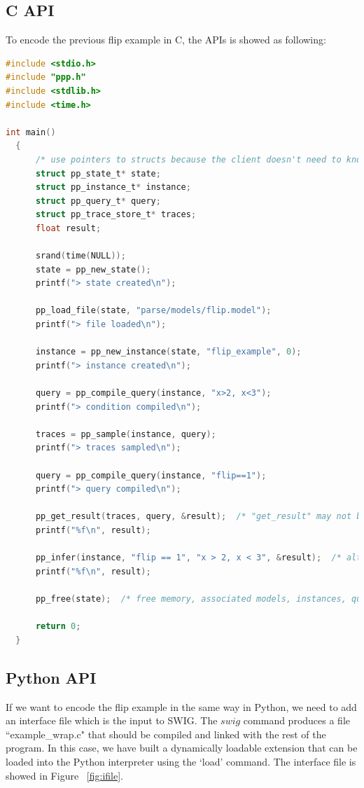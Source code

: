 \subsection{C API}
To encode the previous flip example in C, the APIs is showed as following:
\begin{lstlisting}[language=C]
#include <stdio.h>
#include "ppp.h"
#include <stdlib.h>
#include <time.h>

int main()
  {
      /* use pointers to structs because the client doesn't need to know the struct sizes */
      struct pp_state_t* state;
      struct pp_instance_t* instance;
      struct pp_query_t* query;
      struct pp_trace_store_t* traces;
      float result;

      srand(time(NULL));
      state = pp_new_state();
      printf("> state created\n");

      pp_load_file(state, "parse/models/flip.model");
      printf("> file loaded\n");

      instance = pp_new_instance(state, "flip_example", 0);
      printf("> instance created\n");

      query = pp_compile_query(instance, "x>2, x<3");
      printf("> condition compiled\n");

      traces = pp_sample(instance, query);
      printf("> traces sampled\n");

      query = pp_compile_query(instance, "flip==1");
      printf("> query compiled\n");

      pp_get_result(traces, query, &result);  /* "get_result" may not be a good name */
      printf("%f\n", result);

      pp_infer(instance, "flip == 1", "x > 2, x < 3", &result);  /* alternative way to get a result */
      printf("%f\n", result);

      pp_free(state);  /* free memory, associated models, instances, queries, and trace stores are deallocated */

      return 0;
  }
\end{lstlisting}
  
\subsection{Python API}
If we want to encode the flip example in the same way in Python, we need to add an interface file which is the input to SWIG. The $swig$ command produces a file ``example\_wrap.c" that should be compiled and linked with the rest of the program. In this case, we have built a dynamically loadable extension that can be loaded into the Python interpreter using the `load' command. The interface file is showed in Figure ~\ref{fig:ifile}.


